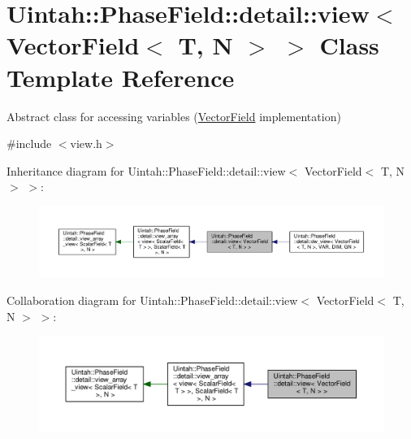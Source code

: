 \hypertarget{classUintah_1_1PhaseField_1_1detail_1_1view_3_01VectorField_3_01T_00_01N_01_4_01_4}{}\section{Uintah\+:\+:Phase\+Field\+:\+:detail\+:\+:view$<$ Vector\+Field$<$ T, N $>$ $>$ Class Template Reference}
\label{classUintah_1_1PhaseField_1_1detail_1_1view_3_01VectorField_3_01T_00_01N_01_4_01_4}


Abstract class for accessing variables (\hyperlink{structUintah_1_1PhaseField_1_1VectorField}{Vector\+Field} implementation)  




{\ttfamily \#include $<$view.\+h$>$}



Inheritance diagram for Uintah\+:\+:Phase\+Field\+:\+:detail\+:\+:view$<$ Vector\+Field$<$ T, N $>$ $>$\+:\nopagebreak
\begin{figure}[H]
\begin{center}
\leavevmode
\includegraphics[width=350pt]{classUintah_1_1PhaseField_1_1detail_1_1view_3_01VectorField_3_01T_00_01N_01_4_01_4__inherit__graph}
\end{center}
\end{figure}


Collaboration diagram for Uintah\+:\+:Phase\+Field\+:\+:detail\+:\+:view$<$ Vector\+Field$<$ T, N $>$ $>$\+:\nopagebreak
\begin{figure}[H]
\begin{center}
\leavevmode
\includegraphics[width=350pt]{classUintah_1_1PhaseField_1_1detail_1_1view_3_01VectorField_3_01T_00_01N_01_4_01_4__coll__graph}
\end{center}
\end{figure}

